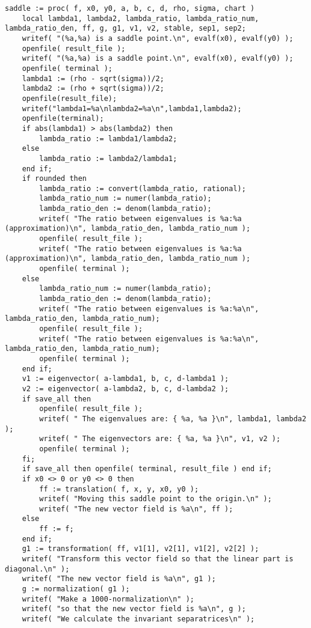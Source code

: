 \documentclass[a4paper,10pt]{article}
\begin{document}
\begin{lstlisting}[name=type]
saddle := proc( f, x0, y0, a, b, c, d, rho, sigma, chart )
    local lambda1, lambda2, lambda_ratio, lambda_ratio_num, lambda_ratio_den, ff, g, g1, v1, v2, stable, sep1, sep2;
    writef( "(%a,%a) is a saddle point.\n", evalf(x0), evalf(y0) );
    openfile( result_file );
    writef( "(%a,%a) is a saddle point.\n", evalf(x0), evalf(y0) );
    openfile( terminal );
    lambda1 := (rho - sqrt(sigma))/2;
    lambda2 := (rho + sqrt(sigma))/2;
    openfile(result_file);
    writef("lambda1=%a\nlambda2=%a\n",lambda1,lambda2);
    openfile(terminal);
    if abs(lambda1) > abs(lambda2) then
        lambda_ratio := lambda1/lambda2;
    else
        lambda_ratio := lambda2/lambda1;
    end if;
    if rounded then
        lambda_ratio := convert(lambda_ratio, rational);
        lambda_ratio_num := numer(lambda_ratio);
        lambda_ratio_den := denom(lambda_ratio);
        writef( "The ratio between eigenvalues is %a:%a (approximation)\n", lambda_ratio_den, lambda_ratio_num );
        openfile( result_file );
        writef( "The ratio between eigenvalues is %a:%a (approximation)\n", lambda_ratio_den, lambda_ratio_num );
        openfile( terminal );
    else
        lambda_ratio_num := numer(lambda_ratio);
        lambda_ratio_den := denom(lambda_ratio);
        writef( "The ratio between eigenvalues is %a:%a\n", lambda_ratio_den, lambda_ratio_num);
        openfile( result_file );
        writef( "The ratio between eigenvalues is %a:%a\n", lambda_ratio_den, lambda_ratio_num);
        openfile( terminal );
    end if;
    v1 := eigenvector( a-lambda1, b, c, d-lambda1 );
    v2 := eigenvector( a-lambda2, b, c, d-lambda2 );
    if save_all then
        openfile( result_file );
        writef( " The eigenvalues are: { %a, %a }\n", lambda1, lambda2 );
        writef( " The eigenvectors are: { %a, %a }\n", v1, v2 );
        openfile( terminal );
    fi;
    if save_all then openfile( terminal, result_file ) end if;
    if x0 <> 0 or y0 <> 0 then
        ff := translation( f, x, y, x0, y0 );
        writef( "Moving this saddle point to the origin.\n" );
        writef( "The new vector field is %a\n", ff );
    else
        ff := f;
    end if;
    g1 := transformation( ff, v1[1], v2[1], v1[2], v2[2] );
    writef( "Transform this vector field so that the linear part is diagonal.\n" );
    writef( "The new vector field is %a\n", g1 );
    g := normalization( g1 );
    writef( "Make a 1000-normalization\n" );
    writef( "so that the new vector field is %a\n", g );
    writef( "We calculate the invariant separatrices\n" );

\end{lstlisting}
\end{document}
